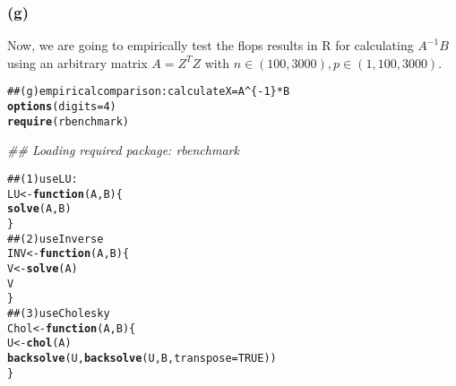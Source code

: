 \documentclass{article}\usepackage{graphicx, color}
\makeatletter
\newcommand{\hlfunctioncall}[1]{\textcolor[rgb]{0.501960784313725,0,0.329411764705882}{\textbf{#1}}}%
\newcommand{\hlcomment}[1]{\textcolor[rgb]{0.180392156862745,0.6,0.341176470588235}{#1}}%
\newenvironment{kframe}{%
 \def\at@end@of@kframe{}%
 \ifinner\ifhmode%
  \def\at@end@of@kframe{\end{minipage}}%
  \begin{minipage}{\columnwidth}%
 \fi\fi%
 \def\FrameCommand##1{\hskip\@totalleftmargin \hskip-\fboxsep
 \colorbox{shadecolor}{##1}\hskip-\fboxsep
     \hskip-\linewidth \hskip-\@totalleftmargin \hskip\columnwidth}%
 \MakeFramed {\advance\hsize-\width
   \@totalleftmargin\z@ \linewidth\hsize
   \@setminipage}}%
 {\par\unskip\endMakeFramed%
 \at@end@of@kframe}
\newenvironment{knitrout}{}{} %
\makeatother
\begin{document}
\subsubsection*{(g)}
Now, we are going to empirically test the flops results in R for calculating $A^{-1}B$ using
an arbitrary matrix $A=Z^TZ$ with $n\in (100,3000), p\in (1,100,3000)$.

\begin{knitrout}
\color{fgcolor}\begin{kframe}
\begin{alltt}
\hlcomment{## (g) empirical comparison: calculate X = A^\{-1\}*B}
\hlfunctioncall{options}(digits = 4)
\hlfunctioncall{require}(rbenchmark)
\end{alltt}


{\ttfamily\noindent\itshape\textcolor{messagecolor}{\#\# Loading required package: rbenchmark}}\begin{alltt}
\hlcomment{## (1) use LU:}
LU <- \hlfunctioncall{function}(A, B) \{
    \hlfunctioncall{solve}(A, B)
\}
\hlcomment{## (2) use Inverse}
INV <- \hlfunctioncall{function}(A, B) \{
    V <- \hlfunctioncall{solve}(A)
    V %*% B
\}
\hlcomment{## (3) use Cholesky}
Chol <- \hlfunctioncall{function}(A, B) \{
    U <- \hlfunctioncall{chol}(A)
    \hlfunctioncall{backsolve}(U, \hlfunctioncall{backsolve}(U, B, transpose = TRUE))
\}


\end{alltt}
\end{kframe}
\end{knitrout}
\end{document}
